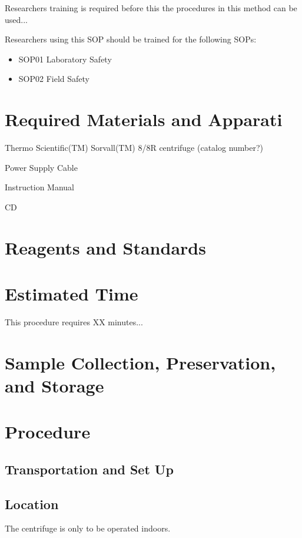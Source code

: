 \documentclass[12pt]{../SOP3_beta}
\begin{document}
\NP Researchers training is required before this the procedures in this method can be used... 

\NP Researchers using this SOP should be trained for the following SOPs:

\begin{itemize}
  \item SOP01 Laboratory Safety
  \item SOP02 Field Safety
\end{itemize}

\section{Required Materials and Apparati}

\NP Thermo Scientific(TM) Sorvall(TM) 8/8R centrifuge (catalog number?)

\NP Power Supply Cable

\NP Instruction Manual

\NP CD

\section{Reagents and Standards}

\section{Estimated Time}

\NP This procedure requires XX minutes...

\section{Sample Collection, Preservation, and Storage}

\section{Procedure}

\subsection {Transportation and Set Up}

\subsection {Location}

\NP The centrifuge is only to be operated indoors.
\end{document}
